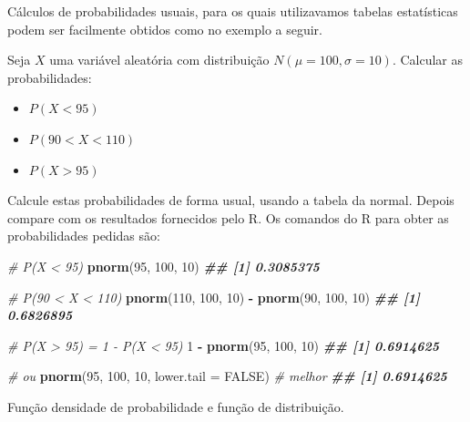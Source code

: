 \documentclass[
]{book}
\newenvironment{Shaded}{\begin{snugshade}}{\end{snugshade}}
\newcommand{\AttributeTok}[1]{\textcolor[rgb]{0.13,0.29,0.53}{#1}}
\newcommand{\CommentTok}[1]{\textcolor[rgb]{0.56,0.35,0.01}{\textit{#1}}}
\newcommand{\ConstantTok}[1]{\textcolor[rgb]{0.56,0.35,0.01}{#1}}
\newcommand{\DecValTok}[1]{\textcolor[rgb]{0.00,0.00,0.81}{#1}}
\newcommand{\DocumentationTok}[1]{\textcolor[rgb]{0.56,0.35,0.01}{\textbf{\textit{#1}}}}
\newcommand{\FunctionTok}[1]{\textcolor[rgb]{0.13,0.29,0.53}{\textbf{#1}}}
\newcommand{\NormalTok}[1]{#1}
\newcommand{\SpecialCharTok}[1]{\textcolor[rgb]{0.81,0.36,0.00}{\textbf{#1}}}
\begin{document}
Cálculos de probabilidades usuais, para os quais utilizavamos tabelas estatísticas podem ser facilmente obtidos como no exemplo a seguir.

Seja \(X\) uma variável aleatória com distribuição \(N(\mu=100, \sigma=10)\). Calcular as probabilidades:

\begin{itemize}
\item
  \(P(X < 95)\)
\item
  \(P(90 < X < 110)\)
\item
  \(P(X > 95)\)
\end{itemize}

Calcule estas probabilidades de forma usual, usando a tabela da normal. Depois compare com os resultados fornecidos pelo R. Os comandos do R para obter as probabilidades pedidas são:

\begin{Shaded}
\begin{Highlighting}[]
\CommentTok{\# P(X \textless{} 95)}
\FunctionTok{pnorm}\NormalTok{(}\DecValTok{95}\NormalTok{, }\DecValTok{100}\NormalTok{, }\DecValTok{10}\NormalTok{)}
\DocumentationTok{\#\# [1] 0.3085375}

\CommentTok{\# P(90 \textless{} X \textless{} 110)}
\FunctionTok{pnorm}\NormalTok{(}\DecValTok{110}\NormalTok{, }\DecValTok{100}\NormalTok{, }\DecValTok{10}\NormalTok{) }\SpecialCharTok{{-}} \FunctionTok{pnorm}\NormalTok{(}\DecValTok{90}\NormalTok{, }\DecValTok{100}\NormalTok{, }\DecValTok{10}\NormalTok{)}
\DocumentationTok{\#\# [1] 0.6826895}

\CommentTok{\# P(X \textgreater{} 95) = 1 {-} P(X \textless{} 95)}
\DecValTok{1} \SpecialCharTok{{-}} \FunctionTok{pnorm}\NormalTok{(}\DecValTok{95}\NormalTok{, }\DecValTok{100}\NormalTok{, }\DecValTok{10}\NormalTok{)}
\DocumentationTok{\#\# [1] 0.6914625}

\CommentTok{\# ou}
\FunctionTok{pnorm}\NormalTok{(}\DecValTok{95}\NormalTok{, }\DecValTok{100}\NormalTok{, }\DecValTok{10}\NormalTok{, }\AttributeTok{lower.tail =} \ConstantTok{FALSE}\NormalTok{) }\CommentTok{\# melhor}
\DocumentationTok{\#\# [1] 0.6914625}
\end{Highlighting}
\end{Shaded}

Função densidade de probabilidade e função de distribuição.
\end{document}
